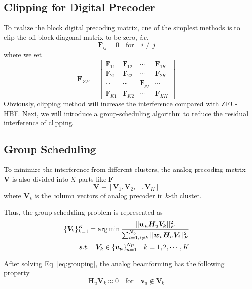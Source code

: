 \documentclass[conference]{IEEEtran}
\def\argmin{\mathop{\mbox{arg\,min}}}
\begin{document}
\subsection{Clipping for Digital Precoder}
To realize the block digital precoding matrix, one of the simplest methods is to clip the off-block diagonal matrix to be zero, \textit{i.e.}
\begin{equation}
	\bm{F}_{ij} = 0 \quad \text{for} \quad i\neq j
\end{equation}
where we set
\begin{equation}
\bm{F}_{ZF}=
\begin{bmatrix}
\bm{F}_{11}& \bm{F}_{12}&\cdots&\bm{F}_{1K}\\
\bm{F}_{21}& \bm{F}_{22}&\cdots&\bm{F}_{2K}\\
\cdots&\cdots&\bm{F}_{pj}&\cdots\\
\bm{F}_{K1}&\bm{F}_{K2}&\cdots&\bm{F}_{KK}
\end{bmatrix}
\end{equation}
Obviously, clipping method will increase the interference compared with ZFU-HBF. Next, we will introduce a group-scheduling algorithm to reduce the residual interference of clipping.

\subsection{Group Scheduling }
To minimize the interference from different clusters, the analog precoding matrix $\bm{V}$ is also divided into $K$ parts like $\bm{F}$
\begin{equation}
\bm{V} = [\bm{V}_1, \bm{V}_2, \cdots, \bm{V}_K]	
\end{equation}
where $\bm{V}_k$ is the column vectors of analog precoder in $k$-th cluster.

Thus, the group scheduling problem is represented as
\begin{align}\label{eq:grouping}
\{\bm{V}_k\}_{k=1}^{K} &= \argmin \frac{||\bm{w}_u \bm{H}_u \bm{V}_k||_F^2}{\sum_{i=1,i\neq k}^{N_U}||\bm{w}_u \bm{H}_u \bm{V}_i||_F^2}  \\ \nonumber
s.t. &\quad \bm{V}_k \in  \{\bm{v_u}\}_{u=1}^{N_U} \quad k = 1,2,\cdots,K
\end{align}

After solving Eq. \eqref{eq:grouping}, the analog beamforming has the following property
\begin{equation}
	\bm{H}_u \bm{V}_{k}\approx 0 \quad \text{for} \quad \bm{v}_u\not\in \bm{V}_k
\end{equation}
\end{document}
